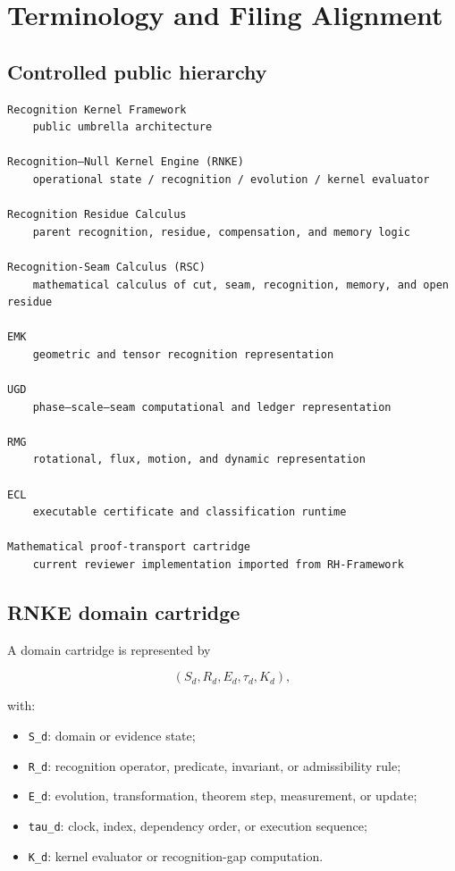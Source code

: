 \hypertarget{terminology-and-filing-alignment}{%
\chapter{Terminology and Filing Alignment}\label{terminology-and-filing-alignment}}

\hypertarget{controlled-public-hierarchy}{%
\section{Controlled public hierarchy}\label{controlled-public-hierarchy}}

\begin{verbatim}
Recognition Kernel Framework
    public umbrella architecture

Recognition–Null Kernel Engine (RNKE)
    operational state / recognition / evolution / kernel evaluator

Recognition Residue Calculus
    parent recognition, residue, compensation, and memory logic

Recognition-Seam Calculus (RSC)
    mathematical calculus of cut, seam, recognition, memory, and open residue

EMK
    geometric and tensor recognition representation

UGD
    phase–scale–seam computational and ledger representation

RMG
    rotational, flux, motion, and dynamic representation

ECL
    executable certificate and classification runtime

Mathematical proof-transport cartridge
    current reviewer implementation imported from RH-Framework
\end{verbatim}

\hypertarget{rnke-domain-cartridge}{%
\section{RNKE domain cartridge}\label{rnke-domain-cartridge}}

A domain cartridge is represented by

\[
(S_d,R_d,E_d,\tau_d,K_d),
\]

with:

\begin{itemize}
\tightlist
\item
  \texttt{S\_d}: domain or evidence state;
\item
  \texttt{R\_d}: recognition operator, predicate, invariant, or admissibility rule;
\item
  \texttt{E\_d}: evolution, transformation, theorem step, measurement, or update;
\item
  \texttt{tau\_d}: clock, index, dependency order, or execution sequence;
\item
  \texttt{K\_d}: kernel evaluator or recognition-gap computation.
\end{itemize}

